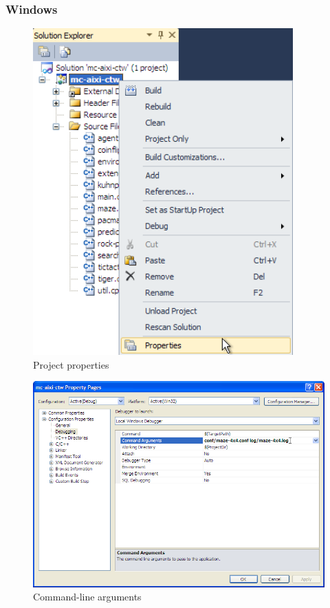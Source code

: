 \documentclass[a4paper,11pt]{article}
\begin{document}
\subsubsection{Windows}
\begin{figure}[hp]
  \begin{center}
    \includegraphics[width=10cm]{img/properties.png}
    \caption{Project properties}
    \label{fig:properties}
  \end{center}
\end{figure}
\begin{figure}[hp]
  \begin{center}
    \includegraphics[width=16cm]{img/arguments.png}
    \caption{Command-line arguments}
    \label{fig:arguments}
  \end{center}
\end{figure}
\end{document}
